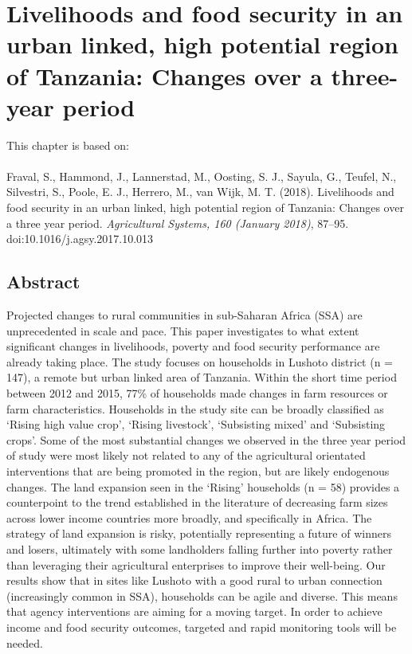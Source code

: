 \chapter[Livelihoods and food security in an urban linked, high potential region of Tanzania: Changes over a three-year period]{Livelihoods and food security in an urban linked, high potential region of Tanzania: Changes over a three-year period}
\label{cha:chapter4}
\vspace*{\fill}
This chapter is based on:
\\
\\



Fraval, S., Hammond, J., Lannerstad, M., Oosting, S. J., Sayula, G., Teufel, N., Silvestri, S., Poole, E. J., Herrero, M., van Wijk, M. T. (2018). Livelihoods and food security in an urban linked, high potential region of Tanzania: Changes over a three year period. \textit{Agricultural Systems, 160 (January 2018)}, 87–95. doi:10.1016/j.agsy.2017.10.013



\newpage

\section*{Abstract}
Projected changes to rural communities in sub-Saharan Africa (SSA) are unprecedented in scale and pace. This paper investigates to what extent signiﬁcant changes in livelihoods, poverty and food security performance are already taking place. The study focuses on households in Lushoto district (n = 147), a remote but urban linked area of Tanzania. Within the short time period between 2012 and 2015, 77\% of households made changes in farm resources or farm characteristics. Households in the study site can be broadly classiﬁed as `Rising high value crop', `Rising livestock', `Subsisting mixed' and `Subsisting crops'. Some of the most substantial changes we observed in the three year period of study were most likely not related to any of the agricultural orientated interventions that are being promoted in the region, but are likely endogenous changes. The land expansion seen in the `Rising' households (n = 58) provides a counterpoint to the trend established in the literature of decreasing farm sizes across lower income countries more broadly, and speciﬁcally in Africa. The strategy of land expansion is risky, potentially representing a future of winners and losers, ultimately with some landholders falling further into poverty rather than leveraging their agricultural enterprises to improve their well-being. Our results show that in sites like Lushoto with a good rural to urban connection (increasingly common in SSA), households can be agile and diverse. This means that agency interventions are aiming for a moving target. In order to achieve income and food security outcomes, targeted and rapid monitoring tools will be needed.

